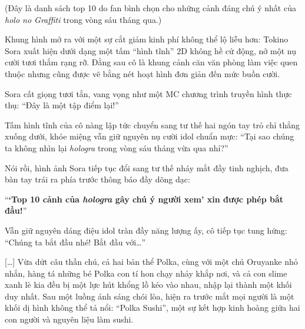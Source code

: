 \documentclass[../main.tex]{subfiles}
\begin{document}

\begin{center}
  (Đây là danh sách top 10 do fan bình chọn cho những cảnh đáng chú ý nhất của \textit{holo no Graffiti} trong vòng sáu tháng qua.)
\end{center}

Khung hình mở ra với một sự cắt giảm kinh phí không thể lộ liễu hơn: Tokino Sora xuất hiện dưới dạng một tấm ``hình tĩnh'' 2D không hề cử động, nở một nụ cười tươi thắm rạng rỡ. Đằng sau cô là khung cảnh căn văn phòng làm việc quen thuộc nhưng cũng được vẽ bằng nét hoạt hình đơn giản đến mức buồn cười.


Sora cất giọng tươi tắn, vang vọng như một MC chương trình truyền hình thực thụ: ``Đây là một tập điểm lại!''

Tấm hình tĩnh của cô nàng lập tức chuyển sang tư thế hai ngón tay trỏ chỉ thẳng xuống dưới, khóe miệng vẫn giữ nguyên nụ cười idol chuẩn mực: ``Tại sao chúng ta không nhìn lại \textit{hologra} trong vòng sáu tháng vừa qua nhỉ?''

Nói rồi, hình ảnh Sora tiếp tục đổi sang tư thế nháy mắt đầy tinh nghịch, đưa bàn tay trái ra phía trước thông báo đầy dõng dạc:

\begin{center}
  ``\textbf{`Top 10 cảnh của \textit{hologra} gây chú ý người xem' xin được phép bắt đầu!}''
\end{center}

Vẫn giữ nguyên dáng điệu idol tràn đầy năng lượng ấy, cô tiếp tục tung hứng: ``Chúng ta bắt đầu nhé! Bắt đầu với\dots''

\il


[\dots] Vừa dứt câu thần chú, cả hai bản thể Polka, cùng với một chú Oruyanke nhỏ nhắn, hàng tá những bé Polka con tí hon chạy nhảy khắp nơi, và cả con slime xanh lè kia đều bị một lực hút khổng lồ kéo vào nhau, nhập lại thành một khối duy nhất. Sau một luồng ánh sáng chói lòa, hiện ra trước mắt mọi người là một khối dị hình không thể tả nổi: ``Polka Sushi'', một sự kết hợp kinh hoàng giữa hai con người và nguyên liệu làm sushi.
\end{document}
